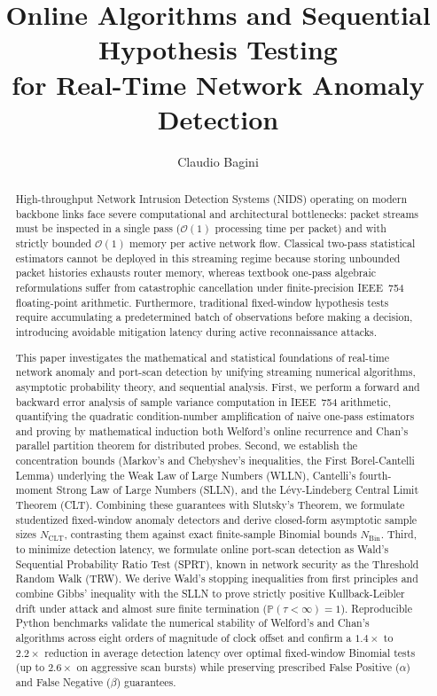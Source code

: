 \documentclass[oneside,noexaminfo,english]{sapthesis}
\title{Online Algorithms and Sequential Hypothesis Testing \\for Real-Time Network Anomaly Detection}
\author{Claudio Bagini}
\numberwithin{equation}{section}
\numberwithin{figure}{section}
\numberwithin{table}{section}
\theoremstyle{compactplain}
\theoremstyle{compactdef}
\theoremstyle{compactrem}
\newcommand{\Prob}{\mathbb{P}}
\begin{document}
\frontmatter
\maketitle

\begin{abstract}
High-throughput Network Intrusion Detection Systems (NIDS) operating on modern backbone links face severe computational and architectural bottlenecks: packet streams must be inspected in a single pass ($\mathcal{O}(1)$ processing time per packet) and with strictly bounded $\mathcal{O}(1)$ memory per active network flow. Classical two-pass statistical estimators cannot be deployed in this streaming regime because storing unbounded packet histories exhausts router memory, whereas textbook one-pass algebraic reformulations suffer from catastrophic cancellation under finite-precision IEEE~754 floating-point arithmetic. Furthermore, traditional fixed-window hypothesis tests require accumulating a predetermined batch of observations before making a decision, introducing avoidable mitigation latency during active reconnaissance attacks.

This paper investigates the mathematical and statistical foundations of real-time network anomaly and port-scan detection by unifying streaming numerical algorithms, asymptotic probability theory, and sequential analysis. First, we perform a forward and backward error analysis of sample variance computation in IEEE~754 arithmetic, quantifying the quadratic condition-number amplification of naive one-pass estimators and proving by mathematical induction both Welford's online recurrence and Chan's parallel partition theorem for distributed probes. Second, we establish the concentration bounds (Markov's and Chebyshev's inequalities, the First Borel-Cantelli Lemma) underlying the Weak Law of Large Numbers (WLLN), Cantelli's fourth-moment Strong Law of Large Numbers (SLLN), and the L\'evy-Lindeberg Central Limit Theorem (CLT). Combining these guarantees with Slutsky's Theorem, we formulate studentized fixed-window anomaly detectors and derive closed-form asymptotic sample sizes $N_{\mathrm{CLT}}$, contrasting them against exact finite-sample Binomial bounds $N_{\mathrm{Bin}}$. Third, to minimize detection latency, we formulate online port-scan detection as Wald's Sequential Probability Ratio Test (SPRT), known in network security as the Threshold Random Walk (TRW). We derive Wald's stopping inequalities from first principles and combine Gibbs' inequality with the SLLN to prove strictly positive Kullback-Leibler drift under attack and almost sure finite termination ($\Prob(\tau < \infty) = 1$). Reproducible Python benchmarks validate the numerical stability of Welford's and Chan's algorithms across eight orders of magnitude of clock offset and confirm a $1.4\times$ to $2.2\times$ reduction in average detection latency over optimal fixed-window Binomial tests (up to $2.6\times$ on aggressive scan bursts) while preserving prescribed False Positive ($\alpha$) and False Negative ($\beta$) guarantees.
\end{abstract}
\end{document}
